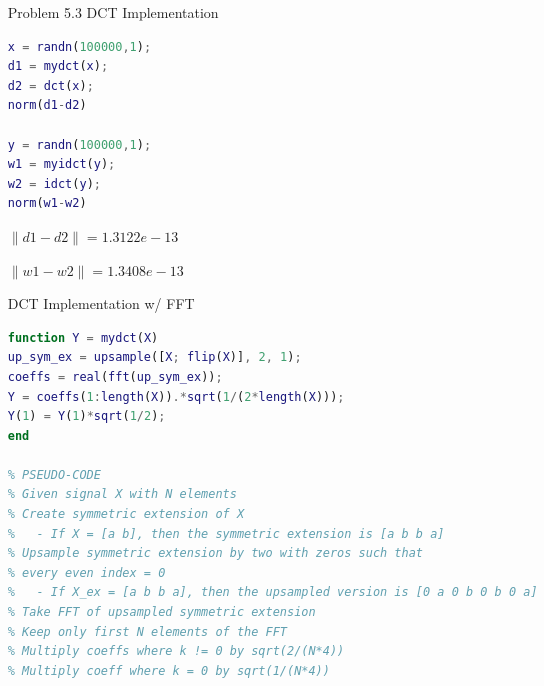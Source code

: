 \documentclass[12pt]{article}
\begin{document}
\begin{enumerate}
\begin{enumerate}
\begin{lstlisting}[language=matlab]
    for i = 1:rows
        for j = 1:cols
            COEFF((i-1)*N+1:i*N, (j-1)*N+1:j*N) = Q.*round(coeffs((i-1)*N+1:i*N, (j-1)*N+1:j*N)./Q);
        end
    end

    IM_C = block_idct2(COEFF, N);
end
\end{lstlisting}

\newpage

Calculations
\begin{lstlisting}[language=matlab]
img = double(imread("frog.tiff")) - 128;

[img_approx, coeffs] = block_dct2_approx_quant(img);

error = log10(norm(img-img_approx, 'fro')^2/norm(img, 'fro')^2);
n = nnz(coeffs);
error1 = norm(coeffs-block_dct2(img, 8), 'fro');
error2 = norm(img_approx-img, 'fro');
fprintf("Number of Non-Zero Coefficients = %d\n", n);
fprintf("|a_approx - a| = %d\n", error1);
fprintf("|x_approx - x| = %d\n", error2);
fprintf("Relative Error (dB) = %d\n", error);


figure(1);
imagesc(img_approx);
title("Approximation w/ Quantized Coefficients");
figure(2);
imagesc(img); 
title("Original Image");
hold off;
\end{lstlisting}

\end{enumerate}

\item[Problem 5.3] DCT Implementation

\begin{lstlisting}[language=matlab]
x = randn(100000,1);
d1 = mydct(x);
d2 = dct(x);
norm(d1-d2)

y = randn(100000,1);
w1 = myidct(y);
w2 = idct(y);
norm(w1-w2)
\end{lstlisting}

\begin{framed}
$\|d1-d2\| = 1.3122e-13$

$\|w1-w2\| = 1.3408e-13$
\end{framed}

\newpage

DCT Implementation w/ FFT
\begin{lstlisting}[language=matlab]
function Y = mydct(X)
up_sym_ex = upsample([X; flip(X)], 2, 1);
coeffs = real(fft(up_sym_ex));
Y = coeffs(1:length(X)).*sqrt(1/(2*length(X)));
Y(1) = Y(1)*sqrt(1/2);
end

% PSEUDO-CODE
% Given signal X with N elements
% Create symmetric extension of X
%   - If X = [a b], then the symmetric extension is [a b b a]
% Upsample symmetric extension by two with zeros such that
% every even index = 0
%   - If X_ex = [a b b a], then the upsampled version is [0 a 0 b 0 b 0 a]
% Take FFT of upsampled symmetric extension
% Keep only first N elements of the FFT
% Multiply coeffs where k != 0 by sqrt(2/(N*4))
% Multiply coeff where k = 0 by sqrt(1/(N*4))
\end{lstlisting}


\end{enumerate}
\end{document}
